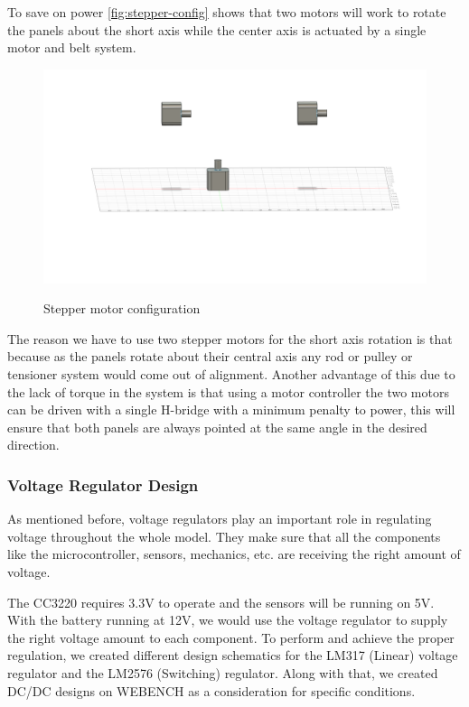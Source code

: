 To save on power \autoref{fig:stepper-config} shows that two motors will work to rotate the panels about the short axis while the center axis is actuated by a single motor and belt system.
\begin{figure}[H]
    \centering
    \caption{Stepper motor configuration}
    \includegraphics[width=\textwidth]{images/stepper-config.png}
    \label{fig:stepper-config}
\end{figure}
The reason we have to use two stepper motors for the short axis rotation is that because as the panels rotate about their central axis any rod or pulley or tensioner system would come out of alignment. Another advantage of this due to the lack of torque in the system is that using a motor controller the two motors can be driven with a single H-bridge with a minimum penalty to power, this will ensure that both panels are always pointed at the same angle in the desired direction.\par
\subsubsection{Voltage Regulator Design}
As mentioned before, voltage regulators play an important role in regulating voltage throughout the whole model. They make sure that all the components like the microcontroller, sensors, mechanics, etc. are receiving the right amount of voltage.\par
The CC3220 requires 3.3V to operate and the sensors will be running on 5V. With the battery running at 12V, we would use the voltage regulator to supply the right voltage amount to each component. To perform and achieve the proper regulation, we created different design schematics for the LM317 (Linear) voltage regulator and the LM2576 (Switching) regulator. Along with that, we created DC/DC designs on WEBENCH as a consideration for specific conditions.\par
